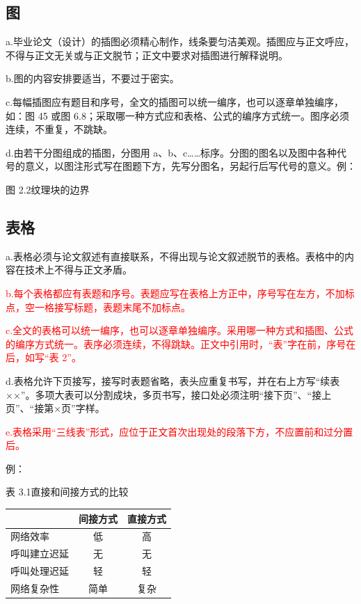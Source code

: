 \subsection{图}

a.毕业论文（设计）的插图必须精心制作，线条要匀洁美观。插图应与正文呼应，不得与正文无关或与正文脱节；正文中要求对插图进行解释说明。

b.图的内容安排要适当，不要过于密实。

c.每幅插图应有题目和序号，全文的插图可以统一编序，也可以逐章单独编序，如：图 45 或图 6.8；采取哪一种方式应和表格、公式的编序方式统一。图序必须连续，不重复，不跳缺。

d.由若干分图组成的插图，分图用 a、b、c……标序。分图的图名以及图中各种代号的意义，以图注形式写在图题下方，先写分图名，另起行后写代号的意义。例：

\vspace{7\baselineskip}
\begin{center}
图 2.2\quad 纹理块的边界
\end{center}

\subsection{表格}

a.表格必须与论文叙述有直接联系，不得出现与论文叙述脱节的表格。表格中的内容在技术上不得与正文矛盾。

\textcolor{red}{b.每个表格都应有表题和序号。表题应写在表格上方正中，序号写在左方，不加标点，空一格接写标题，表题末尾不加标点。}

\textcolor{red}{c.全文的表格可以统一编序，也可以逐章单独编序。采用哪一种方式和插图、公式的编序方式统一。表序必须连续，不得跳缺。正文中引用时，“表”字在前，序号在后，如写“表 2”。}

d.表格允许下页接写，接写时表题省略，表头应重复书写，并在右上方写“续表××”。多项大表可以分割成块，多页书写，接口处必须注明“接下页”、“接上页”、“接第×页”字样。

\textcolor{red}{e.表格采用“三线表”形式，应位于正文首次出现处的段落下方，不应置前和过分置后。}

例：

\begin{center}
\zihaowu
表 3.1\quad 直接和间接方式的比较

\vspace{0.5\baselineskip}
\begin{tabular}{lcc}
\toprule
 & 间接方式 & 直接方式 \\
\midrule
网络效率 & 低 & 高 \\
呼叫建立迟延 & 无 & 无 \\
呼叫处理迟延 & 轻 & 轻 \\
网络复杂性 & 简单 & 复杂 \\
\bottomrule
\end{tabular}
\end{center}

